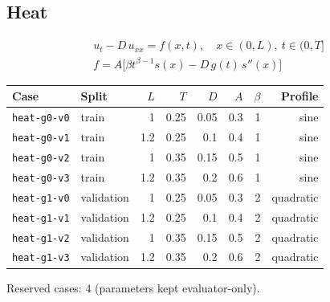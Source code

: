 \documentclass[11pt]{article}
\begin{document}
\subsection{Heat}
\begin{align*}
u_t - D\,u_{xx} = f(x,t),\quad x\in(0,L),\ t\in(0,T]\\
f = A\bigl[\beta t^{\beta-1}s(x) - D\,g(t)\,s''(x)\bigr]
\end{align*}
\begin{center}\small
\begin{tabular}{llrrrrrr}
\toprule
Case & Split & $L$ & $T$ & $D$ & $A$ & $\beta$ & Profile \\
\midrule
\texttt{heat-g0-v0} & train & 1 & 0.25 & 0.05 & 0.3 & 1 & sine \\
\texttt{heat-g0-v1} & train & 1.2 & 0.25 & 0.1 & 0.4 & 1 & sine \\
\texttt{heat-g0-v2} & train & 1 & 0.35 & 0.15 & 0.5 & 1 & sine \\
\texttt{heat-g0-v3} & train & 1.2 & 0.35 & 0.2 & 0.6 & 1 & sine \\
\texttt{heat-g1-v0} & validation & 1 & 0.25 & 0.05 & 0.3 & 2 & quadratic \\
\texttt{heat-g1-v1} & validation & 1.2 & 0.25 & 0.1 & 0.4 & 2 & quadratic \\
\texttt{heat-g1-v2} & validation & 1 & 0.35 & 0.15 & 0.5 & 2 & quadratic \\
\texttt{heat-g1-v3} & validation & 1.2 & 0.35 & 0.2 & 0.6 & 2 & quadratic \\
\bottomrule
\end{tabular}
\end{center}
\noindent Reserved cases: 4 (parameters kept evaluator-only).
\end{document}
